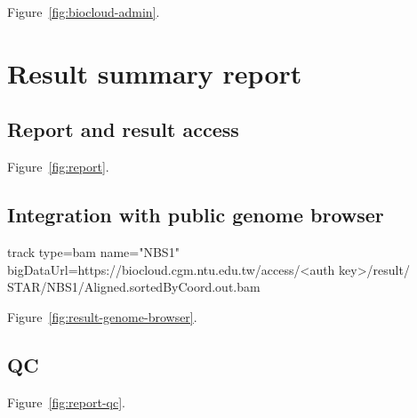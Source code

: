 Figure~\ref{fig:biocloud-admin}.





\section{Result summary report}


\subsection{Report and result access}
\label{s:report-result-access}

Figure~\ref{fig:report}.



\subsection{Integration with public genome browser}

\begin{CVerbatim}[fontsize=\small]
track type=bam name="NBS1"
bigDataUrl=https://biocloud.cgm.ntu.edu.tw/access/<auth key>/result/
STAR/NBS1/Aligned.sortedByCoord.out.bam
\end{CVerbatim}

Figure~\ref{fig:result-genome-browser}.



\subsection{QC}

Figure~\ref{fig:report-qc}.



